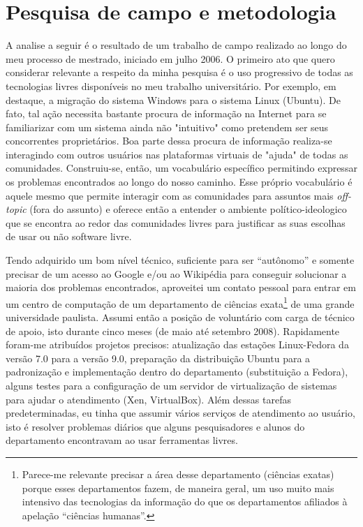 \section{Pesquisa de campo e metodologia} \label{3.1}

A analise a seguir é o resultado de um trabalho de campo realizado ao longo do meu processo de mestrado, iniciado em julho 2006. O primeiro ato que quero considerar relevante a respeito da minha pesquisa é o uso progressivo de todas as tecnologias livres disponíveis no meu trabalho universitário. Por exemplo, em destaque, a migração do sistema Windows para o sistema Linux (Ubuntu). De fato, tal ação necessita bastante procura de informação na Internet para se familiarizar com um sistema ainda não "intuitivo" como pretendem ser seus concorrentes proprietários. Boa parte dessa procura de informação realiza-se interagindo com outros usuários nas plataformas virtuais de "ajuda" de todas as comunidades. Construiu-se, então, um vocabulário específico permitindo expressar os problemas encontrados ao longo do nosso caminho. Esse próprio vocabulário é aquele mesmo que permite interagir com as comunidades para assuntos mais \emph{off-topic} (fora do assunto) e oferece então a entender o ambiente político-ideologico que se encontra ao redor das comunidades livres para justificar as suas escolhas de usar ou não software livre.

Tendo adquirido um bom nível técnico, suficiente para ser “autônomo” e somente precisar de um acesso ao Google e/ou ao Wikipédia para conseguir solucionar a maioria dos problemas encontrados, aproveitei um contato pessoal para entrar em um centro de computação de um departamento de ciências exata\footnote{Parece-me relevante precisar a área desse departamento (ciências exatas) porque esses departamentos fazem, de maneira geral, um uso muito mais intensivo das tecnologias da informação do que os departamentos afiliados à apelação “ciências humanas”.} de uma grande universidade paulista. Assumi então a posição de voluntário com carga de técnico de apoio, isto durante cinco meses (de maio até setembro 2008). Rapidamente foram-me atribuídos projetos precisos: atualização das estações Linux-Fedora da versão 7.0 para a versão 9.0, preparação da distribuição Ubuntu para a padronização e implementação dentro do departamento (substituição a Fedora), alguns testes para a configuração de um servidor de virtualizaç\~ao de sistemas para ajudar o atendimento (Xen, VirtualBox). Além dessas tarefas predeterminadas, eu tinha que assumir vários serviços de atendimento ao usuário, isto é resolver problemas diários que alguns pesquisadores e alunos do departamento encontravam ao usar ferramentas livres.

